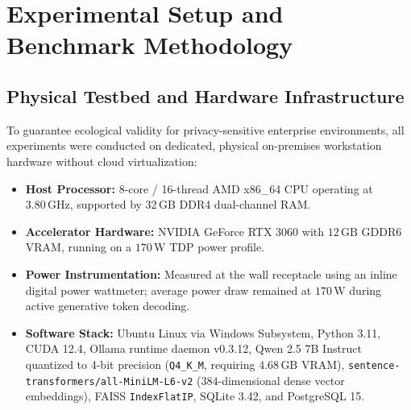 \documentclass[conference,onecolumn,10pt]{IEEEtran}
\begin{document}
\section{Experimental Setup and Benchmark Methodology}
\label{sec:experimental_setup}

\subsection{Physical Testbed and Hardware Infrastructure}
To guarantee ecological validity for privacy-sensitive enterprise environments, all experiments were conducted on dedicated, physical on-premises workstation hardware without cloud virtualization:
\begin{itemize}
    \item \textbf{Host Processor:} 8-core / 16-thread AMD x86\_64 CPU operating at $3.80\,\text{GHz}$, supported by $32\,\text{GB}$ DDR4 dual-channel RAM.
    \item \textbf{Accelerator Hardware:} NVIDIA GeForce RTX 3060 with $12\,\text{GB}$ GDDR6 VRAM, running on a $170\,\text{W}$ TDP power profile.
    \item \textbf{Power Instrumentation:} Measured at the wall receptacle using an inline digital power wattmeter; average power draw remained at $170\,\text{W}$ during active generative token decoding.
    \item \textbf{Software Stack:} Ubuntu Linux via Windows Subsystem, Python 3.11, CUDA 12.4, Ollama runtime daemon v0.3.12, Qwen 2.5 7B Instruct quantized to 4-bit precision (\texttt{Q4\_K\_M}, requiring $4.68\,\text{GB}$ VRAM), \texttt{sentence-transformers/all-MiniLM-L6-v2} ($384$-dimensional dense vector embeddings), FAISS \texttt{IndexFlatIP}, SQLite 3.42, and PostgreSQL 15.
\end{itemize}
\end{document}
